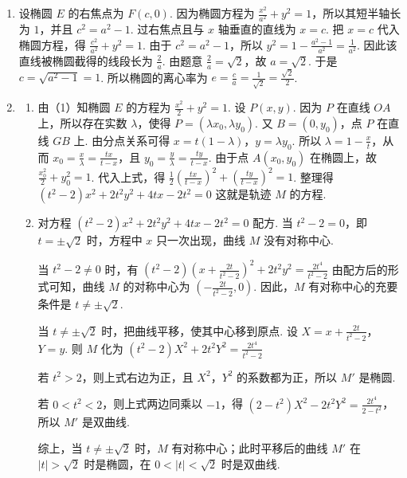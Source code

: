 \documentclass[UTF8,a4paper,oneside,11pt]{ctexbook}
\begin{document}
\begin{solution}
\begin{enumerate}
\item 设椭圆 \(E\) 的右焦点为 \(F(c,0)\). 因为椭圆方程为 \(\frac{x^2}{a^2}+y^2=1\)，所以其短半轴长为 \(1\)，并且 \(c^2=a^2-1\).
过右焦点且与 \(x\) 轴垂直的直线为 \(x=c\). 把 \(x=c\) 代入椭圆方程，得 \(\frac{c^2}{a^2}+y^2=1\). 由于 \(c^2=a^2-1\)，所以 \(y^2=1-\frac{a^2-1}{a^2}=\frac{1}{a^2}\). 因此该直线被椭圆截得的线段长为 \(\frac{2}{a}\). 由题意 \(\frac{2}{a}=\sqrt{2}\)，故 \(a=\sqrt{2}\). 于是 \(c=\sqrt{a^2-1}=1\). 所以椭圆的离心率为 \(e=\frac{c}{a}=\frac{1}{\sqrt{2}}=\frac{\sqrt{2}}{2}\).

\item
    \begin{enumerate}
    \item 由（1）知椭圆 \(E\) 的方程为 \(\frac{x^2}{2}+y^2=1\). 设 \(P(x,y)\). 因为 \(P\) 在直线 \(OA\) 上，所以存在实数 \(\lambda\)，使得 \(P=\left( \lambda x_0,\lambda y_0 \right)\). 又 \(B=(0,y_0)\)，点 \(P\) 在直线 \(GB\) 上. 由分点关系可得 \(x=t\left( 1-\lambda \right)\)，\(y=\lambda y_0\). 所以 \(\lambda=1-\frac{x}{t}\)，从而 \(x_0=\frac{x}{\lambda}=\frac{tx}{t-x}\)，且 \(y_0=\frac{y}{\lambda}=\frac{ty}{t-x}\). 由于点 \(A(x_0,y_0)\) 在椭圆上，故 \(\frac{x_0^2}{2}+y_0^2=1\). 代入上式，得 \(\frac{1}{2}\left( \frac{tx}{t-x} \right)^2+\left( \frac{ty}{t-x} \right)^2=1\). 整理得
\(
\left( t^2-2 \right)x^2+2t^2y^2+4tx-2t^2=0
\)
这就是轨迹 \(M\) 的方程.

    \item 对方程 \(\left( t^2-2 \right)x^2+2t^2y^2+4tx-2t^2=0\) 配方. 当 \(t^2-2=0\)，即 \(t=\pm \sqrt{2}\) 时，方程中 \(x\) 只一次出现，曲线 \(M\) 没有对称中心.

当 \(t^2-2\ne 0\) 时，有
\(
\left( t^2-2 \right)\left( x+\frac{2t}{t^2-2} \right)^2+2t^2y^2=\frac{2t^4}{t^2-2}
\)
由配方后的形式可知，曲线 \(M\) 的对称中心为 \(\left( -\frac{2t}{t^2-2},0 \right)\). 因此，\(M\) 有对称中心的充要条件是 \(t\ne \pm \sqrt{2}\).

当 \(t\ne \pm \sqrt{2}\) 时，把曲线平移，使其中心移到原点. 设 \(X=x+\frac{2t}{t^2-2}\)，\(Y=y\).
则 \(M\) 化为
\(
\left( t^2-2 \right)X^2+2t^2Y^2=\frac{2t^4}{t^2-2}
\)

若 \(t^2>2\)，则上式右边为正，且 \(X^2\)，\(Y^2\) 的系数都为正，所以 \(M'\) 是椭圆.

若 \(0<t^2<2\)，则上式两边同乘以 \(-1\)，得
\(
\left( 2-t^2 \right)X^2-2t^2Y^2=\frac{2t^4}{2-t^2}
\)，
所以 \(M'\) 是双曲线.

综上，当 \(t\ne \pm \sqrt{2}\) 时，\(M\) 有对称中心；此时平移后的曲线 \(M'\) 在 \(\lvert t \rvert>\sqrt{2}\) 时是椭圆，在 \(0<\lvert t \rvert<\sqrt{2}\) 时是双曲线.
    \end{enumerate}
\end{enumerate}
\end{solution}
\end{document}
